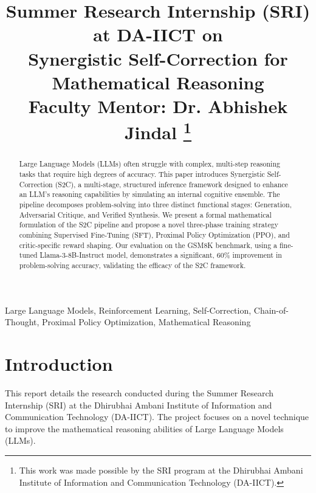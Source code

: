 \documentclass[conference]{IEEEtran}
\begin{document}
\title{Summer Research Internship (SRI) at DA-IICT on\\
{Synergistic Self-Correction for Mathematical Reasoning}\\[1ex]
\large \textbf{Faculty Mentor: Dr. Abhishek Jindal}%
\thanks{This work was made possible by the SRI program at the Dhirubhai Ambani Institute of Information and Communication Technology (DA-IICT).}
}

\author{
}

\maketitle

\begin{abstract}
Large Language Models (LLMs) often struggle with complex, multi-step reasoning tasks that require high degrees of accuracy. This paper introduces Synergistic Self-Correction (S2C), a multi-stage, structured inference framework designed to enhance an LLM's reasoning capabilities by simulating an internal cognitive ensemble. The pipeline decomposes problem-solving into three distinct functional stages: Generation, Adversarial Critique, and Verified Synthesis. We present a formal mathematical formulation of the S2C pipeline and propose a novel three-phase training strategy combining Supervised Fine-Tuning (SFT), Proximal Policy Optimization (PPO), and critic-specific reward shaping. Our evaluation on the GSM8K benchmark, using a fine-tuned Llama-3-8B-Instruct model, demonstrates a significant, 60\% improvement in problem-solving accuracy, validating the efficacy of the S2C framework.
\end{abstract}

\begin{IEEEkeywords}
Large Language Models, Reinforcement Learning, Self-Correction, Chain-of-Thought, Proximal Policy Optimization, Mathematical Reasoning
\end{IEEEkeywords}

\section{Introduction}
This report details the research conducted during the Summer Research Internship (SRI) at the Dhirubhai Ambani Institute of Information and Communication Technology (DA-IICT). The project focuses on a novel technique to improve the mathematical reasoning abilities of Large Language Models (LLMs).
\end{document}
